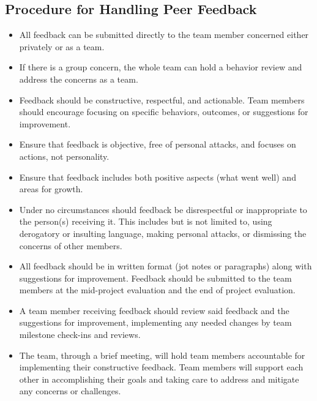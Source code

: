 \documentclass[titlepage]{article}
\begin{document}
\subsection{Procedure for Handling Peer Feedback}
\begin{itemize}
  \item All feedback can be submitted directly to the team member
    concerned either privately or as a team.

  \item If there is a group concern, the whole team can hold a
    behavior review and
    address the concerns as a team.
  \item Feedback should be constructive, respectful, and actionable.
    Team members
    should encourage focusing on specific behaviors, outcomes, or
    suggestions for
    improvement.
  \item Ensure that feedback is objective, free of personal attacks,
    and focuses on
    actions, not personality.
  \item Ensure that feedback includes both positive aspects (what went well) and
    areas for growth.
  \item Under no circumstances should feedback be disrespectful or inappropriate
    to the person(s) receiving it. This includes but is not limited to, using
    derogatory or insulting language, making personal attacks, or dismissing the
    concerns of other members.
  \item All feedback should be in written format (jot notes or
    paragraphs) along with
    suggestions for improvement. Feedback should be submitted to the
    team members
    at the mid-project evaluation and the end of project evaluation.
  \item A team member receiving feedback should review said feedback and the
    suggestions for improvement, implementing any needed changes by team
    milestone check-ins and reviews.
  \item The team, through a brief meeting, will hold team members
    accountable for
    implementing their constructive feedback. Team members will
    support each other
    in accomplishing their goals and taking care to address and
    mitigate any concerns
    or challenges.
\end{itemize}

\newpage
\end{document}
